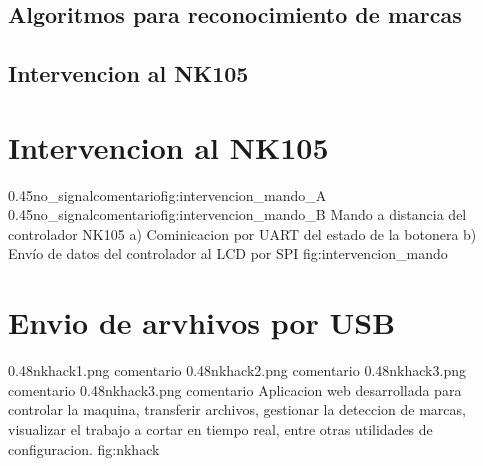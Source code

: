 \subsection{Algoritmos para reconocimiento de marcas}

\subsection{Intervencion al NK105}

\section{Intervencion al NK105}

\subfigab
   {0.45}{no_signal}{comentario}{fig:intervencion_mando_A}
   {0.45}{no_signal}{comentario}{fig:intervencion_mando_B}
         {Mando a distancia del controlador NK105 a) Cominicacion por UART del estado de la botonera b) Envío de datos del controlador al LCD por SPI}
         {fig:intervencion_mando}


\section{Envio de arvhivos por USB}

\subfigtwotwo
         {0.48}{nkhack1.png} {comentario}
         {0.48}{nkhack2.png} {comentario}
         {0.48}{nkhack3.png} {comentario}
         {0.48}{nkhack3.png} {comentario}
         {Aplicacion web desarrollada para controlar la maquina, transferir archivos, gestionar la deteccion de marcas, visualizar el trabajo a cortar en tiempo real, entre otras utilidades de configuracion.}
         {fig:nkhack}
